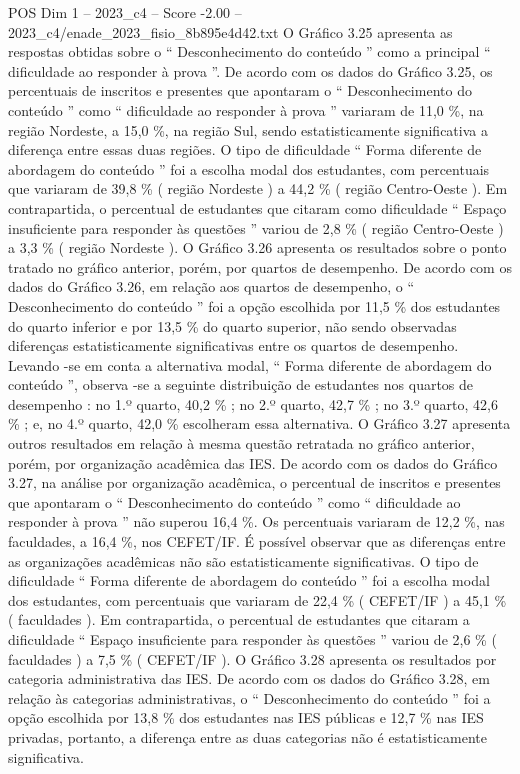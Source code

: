 \begin{textsample}{POS Dim 1 – 2023\_c4 – Score -2.00 – 2023\_c4/enade\_2023\_fisio\_8b895e4d42.txt}
O Gráfico 3.25 apresenta as respostas obtidas sobre o “ Desconhecimento do conteúdo ” como a principal “ dificuldade ao responder à prova ”.
De acordo com os dados do Gráfico 3.25, os percentuais de inscritos e presentes que apontaram o “ Desconhecimento do conteúdo ” como “ dificuldade ao responder à prova ” variaram de 11,0 \%, na região Nordeste, a 15,0 \%, na região Sul, sendo estatisticamente significativa a diferença entre essas duas regiões.
O tipo de dificuldade “ Forma diferente de abordagem do conteúdo ” foi a escolha modal dos estudantes, com percentuais que variaram de 39,8 \% ( região Nordeste ) a 44,2 \% ( região Centro-Oeste ).
Em contrapartida, o percentual de estudantes que citaram como dificuldade “ Espaço insuficiente para responder às questões ” variou de 2,8 \% ( região Centro-Oeste ) a 3,3 \% ( região Nordeste ).
O Gráfico 3.26 apresenta os resultados sobre o ponto tratado no gráfico anterior, porém, por quartos de desempenho.
De acordo com os dados do Gráfico 3.26, em relação aos quartos de desempenho, o “ Desconhecimento do conteúdo ” foi a opção escolhida por 11,5 \% dos estudantes do quarto inferior e por 13,5 \% do quarto superior, não sendo observadas diferenças estatisticamente significativas entre os quartos de desempenho.
Levando -se em conta a alternativa modal, “ Forma diferente de abordagem do conteúdo ”, observa -se a seguinte distribuição de estudantes nos quartos de desempenho : no 1.º quarto, 40,2 \% ; no 2.º quarto, 42,7 \% ; no 3.º quarto, 42,6 \% ; e, no 4.º quarto, 42,0 \% escolheram essa alternativa.
O Gráfico 3.27 apresenta outros resultados em relação à mesma questão retratada no gráfico anterior, porém, por organização acadêmica das IES.
De acordo com os dados do Gráfico 3.27, na análise por organização acadêmica, o percentual de inscritos e presentes que apontaram o “ Desconhecimento do conteúdo ” como “ dificuldade ao responder à prova ” não superou 16,4 \%.
Os percentuais variaram de 12,2 \%, nas faculdades, a 16,4 \%, nos CEFET/IF.
É possível observar que as diferenças entre as organizações acadêmicas não são estatisticamente significativas.
O tipo de dificuldade “ Forma diferente de abordagem do conteúdo ” foi a escolha modal dos estudantes, com percentuais que variaram de 22,4 \% ( CEFET/IF ) a 45,1 \% ( faculdades ).
Em contrapartida, o percentual de estudantes que citaram a dificuldade “ Espaço insuficiente para responder às questões ” variou de 2,6 \% ( faculdades ) a 7,5 \% ( CEFET/IF ).
O Gráfico 3.28 apresenta os resultados por categoria administrativa das IES.
De acordo com os dados do Gráfico 3.28, em relação às categorias administrativas, o “ Desconhecimento do conteúdo ” foi a opção escolhida por 13,8 \% dos estudantes nas IES públicas e 12,7 \% nas IES privadas, portanto, a diferença entre as duas categorias não é estatisticamente significativa.

\end{textsample}
